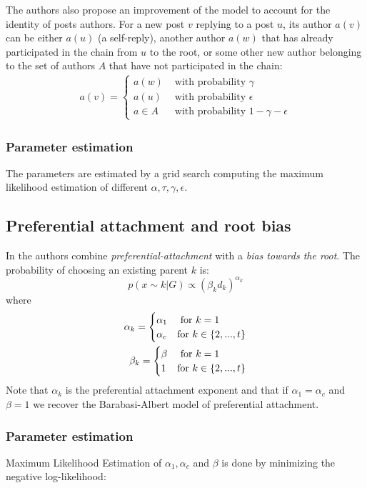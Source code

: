 \documentclass[smallextended]{svjour3}          %
\begin{document}
The authors also propose an improvement of the model to account for the identity of posts authors. For a new post $v$ replying to a post $u$, its author $a(v)$ can be either $a(u)$ (a self-reply), another author $a(w)$ that has already participated in the chain from $u$ to the root, or some other new author belonging to the set of authors $A$ that have not participated in the chain:
\begin{align}
a(v) = 
\begin{cases}
a(w) & \text{ with probability } \gamma\\
a(u) & \text{ with probability } \epsilon\\
a \in A & \text{ with probability } 1 -\gamma - \epsilon 
\end{cases}
\end{align} 

\subsubsection*{Parameter estimation}
The parameters are estimated by a grid search computing the maximum likelihood estimation of different $\alpha, \tau, \gamma, \epsilon$.

\subsection{Preferential attachment and root bias}
In \cite{Gomez2010} the authors combine \textit{preferential-attachment} with a \textit{bias towards the root}. The probability of choosing an existing parent $k$ is:
\[
p(x \sim k | G) 
\propto 
(\beta_k d_{k})^{\alpha_k}
\]
where 
\begin{align}
\alpha_k = 
\begin{cases}
	\alpha_1 & \text{ for } k=1 \\	
	\alpha_c & \text{for } k \in \{2,...,t\}
\end{cases}\notag\\
\beta_k = 
\begin{cases}
\beta & \text{ for } k=1 \\	
1 & \text{for } k \in \{2,...,t\}
\end{cases}
\end{align}
Note that $\alpha_k$ is the preferential attachment exponent and that if $\alpha_1=\alpha_c$ and $\beta=1$ we recover the Barabasi-Albert model of preferential attachment.
\subsubsection*{Parameter estimation}
Maximum Likelihood Estimation of $\alpha_1, \alpha_c$ and $\beta$ is done by minimizing the negative log-likelihood:
\end{document}
